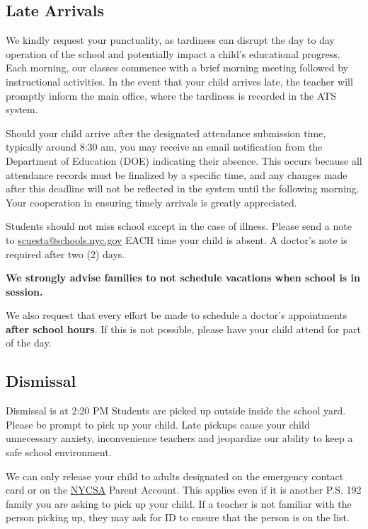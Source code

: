 \documentclass[11pt, letterpaper]{article}
\begin{document}
\subsection{Late Arrivals}
We kindly request your punctuality, as tardiness can disrupt the day to day operation of the school and potentially impact a child's educational progress. Each morning, our classes commence with a brief morning meeting followed by instructional activities. In the event that your child arrives late, the teacher will promptly inform the main office, where the tardiness is recorded in the ATS system.

Should your child arrive after the designated attendance submission time, typically around 8:30 am, you may receive an email notification from the Department of Education (DOE) indicating their absence. This occurs because all attendance records must be finalized by a specific time, and any changes made after this deadline will not be reflected in the system until the following morning. Your cooperation in ensuring timely arrivals is greatly appreciated.

Students should not miss school except in the case of illness. Please send a note to \href{mailto:scuesta@schools.nyc.gov}{scuesta@schools.nyc.gov} EACH time your child is absent. A doctor’s note is required after two (2) days.
  
\textbf{We strongly advise families to not schedule vacations when school is in session.}

We also request that every effort be made to schedule a doctor’s appointments \textbf{after school hours}. If this is not possible, please have your child attend for part of the day.  

\subsection{Dismissal}
Dismissal is at 2:20 PM Students are picked up outside inside the school yard. Please be prompt to pick up your child. Late pickups cause your child unnecessary anxiety, inconvenience teachers and jeopardize our ability to keep a safe school environment.

We can only release your child to adults designated on the emergency contact card or on the \href{https://www.schoolsaccount.nyc/ny}{NYCSA}  Parent Account. This applies even if it is another P.S. 192 family you are asking to pick up your child. If a teacher is not familiar with the person picking up, they may ask for ID to ensure that the person is on the list. 
\end{document}
